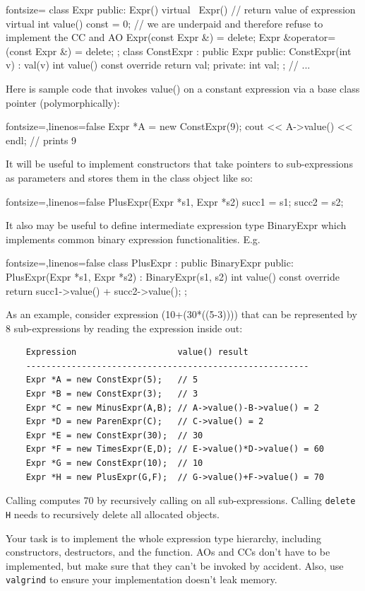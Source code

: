 \documentclass[a4paper,11pt]{article}
\begin{document}
\begin{cppcode*}{fontsize=\scriptsize}
class Expr {
public:
  Expr() { }
  virtual ~Expr() { }
  // return value of expression
  virtual int value() const = 0;
  // we are underpaid and therefore refuse to implement the CC and AO
  Expr(const Expr &) = delete;
  Expr &operator=(const Expr &) = delete;
};
class ConstExpr : public Expr {
public:
    ConstExpr(int v) : val(v) { }
    int value() const override { return val; }
private:
    int val;
};
// ...
\end{cppcode*}

Here is sample code that invokes value() on a constant expression via a base class pointer (polymorphically):
\begin{cppcode*}{fontsize=\scriptsize,linenos=false}
Expr *A = new ConstExpr(9);
cout << A->value() << endl;     // prints 9
\end{cppcode*}

It will be useful to implement constructors that take pointers to sub-expressions as parameters and 
stores them in the class object like so:
\begin{cppcode*}{fontsize=\scriptsize,linenos=false}
PlusExpr(Expr *s1, Expr *s2) {
    succ1 = s1;
    succ2 = s2;
}
\end{cppcode*}

It also may be useful to define intermediate expression type BinaryExpr which implements common binary expression 
functionalities. E.g.

\begin{cppcode*}{fontsize=\scriptsize,linenos=false}
class PlusExpr : public BinaryExpr {
public:
  PlusExpr(Expr *s1, Expr *s2) : BinaryExpr(s1, s2) { }
    int value() const override {
        return succ1->value() + succ2->value();
    }
};
\end{cppcode*}

As an example, consider expression (10+(30*((5-3)))) that can be represented by 8 sub-expressions 
by reading the expression inside out:

\begin{verbatim}
    Expression                    value() result
    --------------------------------------------------------
    Expr *A = new ConstExpr(5);   // 5
    Expr *B = new ConstExpr(3);   // 3
    Expr *C = new MinusExpr(A,B); // A->value()-B->value() = 2
    Expr *D = new ParenExpr(C);   // C->value() = 2  
    Expr *E = new ConstExpr(30);  // 30
    Expr *F = new TimesExpr(E,D); // E->value()*D->value() = 60
    Expr *G = new ConstExpr(10);  // 10
    Expr *H = new PlusExpr(G,F);  // G->value()+F->value() = 70
\end{verbatim}

Calling  computes 70 by recursively calling  on all sub-expressions.
Calling \texttt{delete H} needs to recursively delete all allocated objects.

\medskip 

Your task is to implement the whole expression type hierarchy, including constructors, destructors, and the  function.
AOs and CCs don't have to be implemented, but make sure that they can't be invoked by accident.
Also, use \texttt{valgrind} to ensure your implementation doesn't leak memory.
\end{document}
